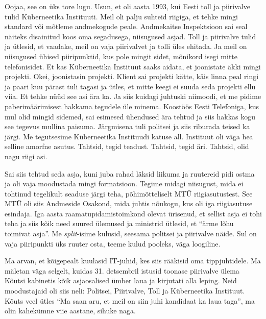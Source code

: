 Oojaa, see on üks tore lugu. Usun, et oli aasta 1993, kui Eesti toll ja piirivalve tulid Küberneetika Instituuti. Meil oli palju suhteid riigiga, et tehke mingi standard või mõtleme andmekogude peale. Andmekaitse Inspektsioon sai seal näiteks disainitud koos oma segadusega,  niisugused asjad. Toll ja piirivalve  tulid ja ütlesid, et  vaadake, meil on vaja piirivalvet ja tolli üles ehitada. Ja meil on niisugused ühised piiripunktid, kus pole  mingit sidet, mõnikord isegi mitte telefonisidet. Et kas Küberneetika Instituut saaks aidata, et joonistate äkki mingi projekti. Okei, joonistasin projekti. Klient sai projekti kätte, käis linna peal ringi ja paari kuu pärast tuli tagasi ja ütles, et mitte keegi ei suuda seda projekti ellu viia. Et tehke nüüd  see asi ära ka. Ja siis kuidagi juhtuski niimoodi, et me pidime paberimäärimisest hakkama tegudele üle minema. Koostöös Eesti Telefoniga, kus mul olid mingid sidemed, sai  esimesed ühendused  ära tehtud ja siis hakkas kogu see tegevus mullina  paisuma. Järgmisena tuli politsei ja siis riburada teised ka järgi. Me tegutsesime Küberneetika Instituudi katuse all. Instituut oli väga hea selline amorfne asutus. Tahtsid, tegid teadust. Tahtsid, tegid äri. Tahtsid, olid nagu riigi asi.

Sai siis tehtud seda asja, kuni juba  rahad läksid liikuma ja ruutereid pidi ostma ja oli vaja moodustada mingi formatsioon. Tegime midagi niisugust, mida ei tohtinud tegelikult seaduse järgi teha, põhimõtteliselt MTÜ riigiasutustest. See MTÜ oli siis Andmeside Osakond, mida  juhtis nõukogu, kus oli iga riigiasutuse esindaja. Iga aasta raamatupidamistoimkond  olevat ürisenud, et sellist asja ei tohi teha ja siis kõik need suured ülemused ja ministrid ütlesid, et \enquote{ärme lõhu toimivat asja}. Me \emph{split}-isime  kulusid, seesama politsei ja piirivalve näide. Sul on vaja piiripunkti üks ruuter osta, teeme kulud pooleks, väga loogiline. 


Ma arvan, et kõigepealt kuulasid IT-juhid, kes siis rääkisid oma tippjuhtidele. Ma mäletan väga selgelt, kuidas 31. detsembril istusid toonase piirivalve ülema Kõutsi kabinetis kõik asjaosalised ümber laua ja kirjutati alla leping. Neid moodustajaid oli siis  neli: Politsei, Piirivalve, Toll ja Küberneetika Instituut. Kõuts veel ütles  \enquote{Ma saan aru, et meil on siin juhi kandidaat ka laua taga}, ma olin kahekümne viie aastane, sihuke naga. 

